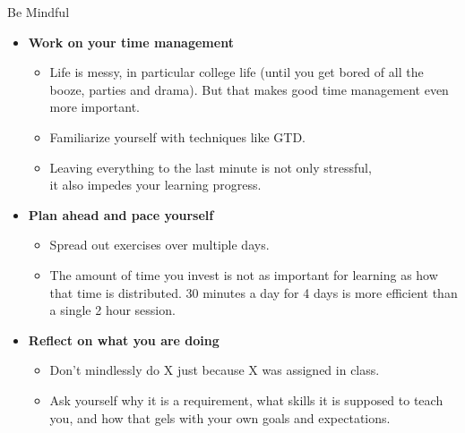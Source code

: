 \documentclass[professionalfonts, xcolor={usenames,svgnames,x11names,table}]{beamer}
\begin{document}
\begin{frame}{Be Mindful}
    \begin{itemize}
        \item \textbf{Work on your time management}\\
            \begin{itemize}
                \item Life is messy, in particular college life (until you get bored of all the booze, parties and drama).
                      But that makes good time management even more important.
                \item Familiarize yourself with techniques like GTD. 
                \item Leaving everything to the last minute is not only stressful,\\
                    it also impedes your learning progress.
            \end{itemize}

        \item \textbf{Plan ahead and pace yourself}\\
            \begin{itemize}
                \item Spread out exercises over multiple days.
                \item The amount of time you invest is not as important for learning as how that time is distributed.
                      30 minutes a day for 4 days is more efficient than a single 2 hour session. 
            \end{itemize}

        \item \textbf{Reflect on what you are doing}\\
            \begin{itemize}
                \item Don't mindlessly do X just because X was assigned in class.
                \item Ask yourself why it is a requirement, what skills it is supposed to teach you, and how that gels with your own goals and expectations. 
            \end{itemize}
    \end{itemize}
\end{frame}
\end{document}
